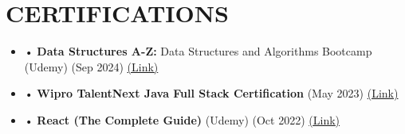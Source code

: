 \documentclass[a4paper,11pt]{article}
\begin{document}
\section{\textbf{CERTIFICATIONS}}

\vspace{2mm}
 \begin{itemize}[leftmargin=0.05in, label={}]
    \item{
     {• \textbf{Data Structures A-Z:} Data Structures and Algorithms Bootcamp (Udemy) (Sep 2024)} {\href{https://udemy-certificate.s3.amazonaws.com/pdf/UC-7551de0c-1fe8-4ce5-b5d2-2abab03991be.pdf} {(\underline{Link})}} \\[4pt]
    }
    \item{
     {• \textbf{Wipro TalentNext Java Full Stack Certification} (May 2023)} {\href{https://cert.diceid.com/csr/cid/xDaKXD} {(\underline{Link})}} \\[4pt]
    }
    \item{
     {• \textbf{React (The Complete Guide)} (Udemy) (Oct 2022)} {\href{https://udemy-certificate.s3.amazonaws.com/pdf/UC-4735e8c3-14c2-4ce0-a62a-981104fb9ff9.pdf} {(\underline{Link})}} \\[4pt]
    }
 \end{itemize}


 \vspace{-10pt}
 
\end{document}
